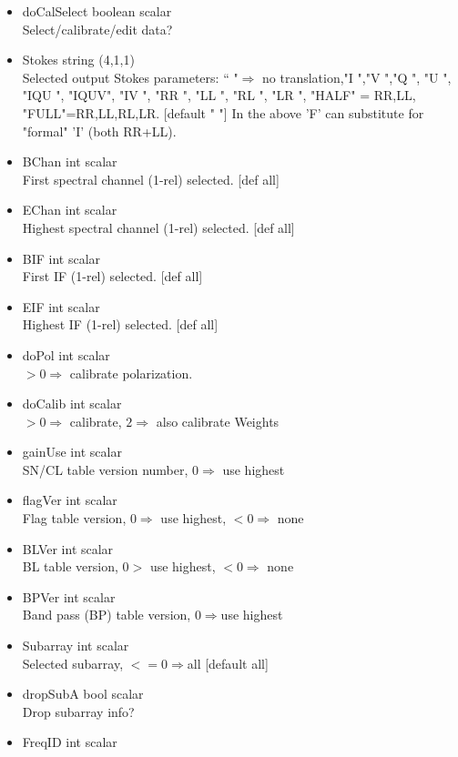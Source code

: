\documentclass[11pt]{report}
\begin{document}
\begin{itemize}
\item  doCalSelect boolean scalar\\
Select/calibrate/edit data?
\item  Stokes string (4,1,1) \\
Selected output Stokes parameters:
``    "$\Rightarrow$ no translation,"I   ","V   ","Q   ", "U   ", 
"IQU ", "IQUV",  "IV  ", "RR  ", "LL  ", "RL  ", "LR  ", 
"HALF" = RR,LL, "FULL"=RR,LL,RL,LR. [default "    "]
In the above 'F' can substitute for "formal" 'I' (both RR+LL).
\item  BChan int scalar \\ 
First spectral channel (1-rel) selected. [def all]
\item  EChan int scalar \\ 
Highest spectral channel (1-rel) selected. [def all]
\item  BIF   int scalar \\ 
First IF (1-rel) selected. [def all]
\item  EIF   int scalar \\ 
Highest IF (1-rel) selected. [def all]
\item  doPol   int scalar \\ 
$>0 \Rightarrow$ calibrate polarization.
\item  doCalib int scalar \\ 
$>0 \Rightarrow$ calibrate, $2 \Rightarrow$ also calibrate Weights
\item  gainUse int scalar \\ 
SN/CL table version number, $0 \Rightarrow$ use highest
\item  flagVer int scalar \\ 
Flag table version, $0 \Rightarrow$ use highest, $<0 \Rightarrow$ none
\item  BLVer   int scalar \\ 
BL table version, $0>$ use highest, $<0 \Rightarrow$ none
\item  BPVer   int scalar \\ 
Band pass (BP) table version, $0 \Rightarrow $use highest
\item  Subarray int scalar \\ 
Selected subarray, $<=0 \Rightarrow$all [default all]
\item  dropSubA bool scalar \\ 
Drop subarray info?
\item  FreqID   int scalar \\ 

\end{itemize}
\end{document}
